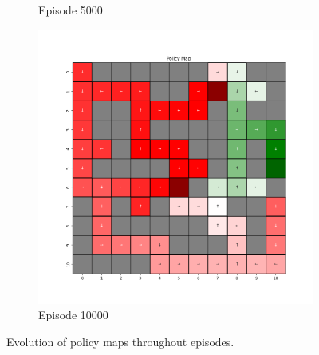 \documentclass{assignment}
\begin{document}
\begin{figure}[H]
\begin{subfigure}{0.3\textwidth}
    \caption{Episode 5000}
    \end{subfigure}\hfill
    \begin{subfigure}{0.3\textwidth}
        \includegraphics[width=\textwidth]{figures/policy_q/alpha_sweep/policy_alpha_0.5_gamma_0.95_epsilon_0.2_iteration_10000.png}
    \caption{Episode 10000}
    \end{subfigure}
    \caption{Evolution of policy maps throughout episodes.}
    \label{fig:alpha_0.5_q_learning_policy}
\end{figure}
\end{document}
